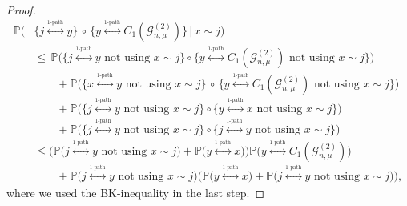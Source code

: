 \documentclass[12pt,a4paper]{article}
\numberwithin{equation}{section}
\begin{document}
\begin{proof}
\begin{align*}    
     \mathbb P \big( & \{j\overset{_{1\text{-path}}}{\longleftrightarrow}y \} \,\circ \, \{y\overset{_{1\text{-path}}}{\longleftrightarrow}C_1(\mathcal G^{(2)}_{n,\mu}) \} \,\big|\,x \sim j \big)
    \\ & \leq \,  \mathbb P \big(\{j\overset{_{1\text{-path}}}{\longleftrightarrow}y\text{ not using } x\sim j \} \circ \{y\overset{_{1\text{-path}}}{\longleftrightarrow}C_1(\mathcal G^{(2)}_{n,\mu})\text{ not using } x\sim j \} \big)
    \\ & \qquad +\mathbb P \big( \{x \overset{_{1\text{-path}}}{\longleftrightarrow} y \text{ not using } x\sim j \} \,\circ \, \{y\overset{_{1\text{-path}}}{\longleftrightarrow}C_1(\mathcal G^{(2)}_{n,\mu})\text{ not using } x\sim j  \}\big) 
    \\ & \qquad + \mathbb P \big(\{j\overset{_{1\text{-path}}}{\longleftrightarrow}y \text{ not using } x\sim j \} \circ \{y \overset{_{1\text{-path}}}{\longleftrightarrow} x \text{ not using } x\sim j \} \big)
    \\ & \qquad + \mathbb P \big(\{j\overset{_{1\text{-path}}}{\longleftrightarrow}y \text{ not using } x\sim j \} \circ \{j\overset{_{1\text{-path}}}{\longleftrightarrow}y \text{ not using } x\sim j \} \big) 
    \\ & \le  \Big( \mathbb P  \big(j\overset{_{1\text{-path}}}{\longleftrightarrow}y \text{ not using } x\sim j  \big)  +  \mathbb P \big( y \overset{_{1\text{-path}}}{\longleftrightarrow} x \big) \Big)\mathbb P \big( y\overset{_{1\text{-path}}}{\longleftrightarrow}C_1(\mathcal G^{(2)}_{n,\mu})\big) 
    \\ & \qquad + \mathbb P \big(j\overset{_{1\text{-path}}}{\longleftrightarrow}y \text{ not using } x\sim j \big)\Big(\mathbb P \big( y \overset{_{1\text{-path}}}{\longleftrightarrow} x  \big)+\mathbb P \big(j\overset{_{1\text{-path}}}{\longleftrightarrow}y \text{ not using } x\sim j \big)\Big),
\end{align*}
where we used the BK-inequality in the last step.

\end{proof}
\end{document}
